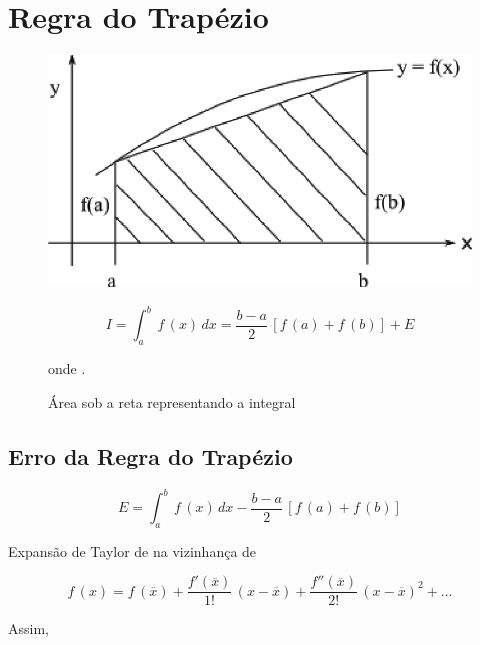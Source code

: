 \section{Regra do Trapézio}

\begin{figure}[htb]
 \centering
\begin{minipage}[c]{7cm}
    \includegraphics[scale=0.8]{capitulos/capitulo2/figuras/regra_trapezio1.eps}
    \caption{Área sob a reta representando a integral}
    \label{fig:regra_trapezio1}
 \end{minipage}\hspace*{1cm}
 \begin{minipage}[c]{6cm}
    \begin{equation}
     \label{cap2:sec2:eq1}
     I = \int_a^b \, f\,(x) \, dx = \frac{b - a}{2} \, [f\,(a) + f\,(b)] + E
    \end{equation}

    onde .
 \end{minipage}
\end{figure}

\subsection{Erro da Regra do Trapézio}

\[
 E = \int_a^b \, f\,(x) \, dx - \frac{b - a}{2} \, [f\,(a) + f\,(b)]
\]

Expansão de Taylor de  na vizinhança de 

\[
 f\,(x) = f\,(\overline{x}) + \frac{f'(\overline{x})}{1!} \, (x - \overline{x}) + \frac{f''(\overline{x})}{2!} \, (x - \overline{x})^2 + \ldots
\]

Assim,

